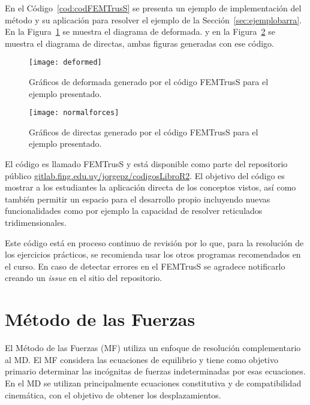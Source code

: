 En el Código~\ref{cod:codFEMTrusS} se presenta un ejemplo de implementación del método y su aplicación para resolver el ejemplo de la Sección~\ref{sec:ejemplobarra}. En la Figura~\ref{fig:ejbarraDef} se muestra el diagrama de deformada. y en la Figura~\ref{fig:ejbarraDir} se muestra el diagrama de directas, ambas figuras generadas con ese código.  %

\begin{figure}[htb!]
	\centering
	\texttt{[image: deformed]}
	\caption{Gráficos de deformada generado por el código FEMTrusS para el ejemplo presentado.}
	\label{fig:ejbarraDef}
\end{figure}

\begin{figure}[htb!]
	\centering
	\texttt{[image: normalforces]}
	\caption{Gráficos de directas generado por el código FEMTrusS para el ejemplo presentado.}
	\label{fig:ejbarraDir}
\end{figure}

El código es llamado FEMTrusS y está disponible como parte del repositorio público \href{https://gitlab.fing.edu.uy/jorgepz/codigosLibroR2}{gitlab.fing.edu.uy/jorgepz/codigosLibroR2}. %
%
El objetivo del código es mostrar a los estudiantes la aplicación directa de los conceptos vistos, así como también permitir un espacio para el desarrollo propio incluyendo nuevas funcionalidades como por ejemplo la capacidad de resolver reticulados tridimensionales. %

Este código está en proceso continuo de revisión por lo que, para la resolución de los ejercicios prácticos, se recomienda usar los otros programas recomendados en el curso. %
%
En caso de detectar errores en el FEMTrusS se agradece notificarlo creando un \textit{issue} en el sitio del repositorio.




\section{Método de las Fuerzas}


El Método de las Fuerzas (MF) utiliza un enfoque de resolución complementario al MD. El MF considera las ecuaciones de equilibrio y tiene como objetivo primario determinar las incógnitas de fuerzas indeterminadas por esas ecuaciones. %
%
En el MD se utilizan principalmente ecuaciones constitutiva y de  compatibilidad cinemática, con el objetivo de obtener los desplazamientos.


